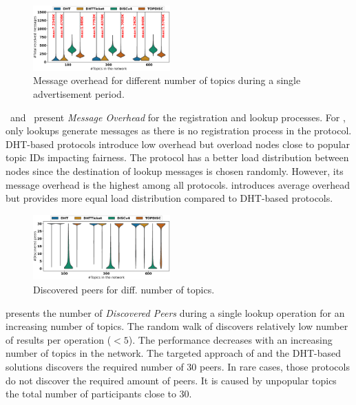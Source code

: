 	
\begin{figure}
\centering
\includegraphics[width=0.470\textwidth]{results/no_split/violin_topic_totalMsg.eps}
\caption{Message overhead for different number of topics during a single advertisement period.}
\label{fig:msgsPerTopic}
\vspace{-0.15in}
\end{figure}

~and~ present \emph{Message Overhead} for the registration and lookup processes. For \discv, only lookups generate messages as there is no registration process in the protocol.
DHT-based protocols introduce low overhead but overload nodes close to popular topic IDs impacting fairness.
The \discv protocol has a better load distribution between nodes since the destination of lookup messages is chosen randomly. However, its message overhead is the highest among all protocols. 
\sysname introduces average overhead but provides more equal load distribution compared to DHT-based protocols.


\begin{figure}[!h]
\includegraphics[width=0.470\textwidth]{results/no_split/violin_topic_discovered.eps}
\vspace{-0.05in}
\caption{Discovered peers for diff. number of topics.}
\label{fig:discoveredPerTopic}
\end{figure}

 presents the number of \emph{Discovered Peers} during a single lookup operation for an increasing number of topics. The random walk of \discv discovers relatively low number of results per operation ($< 5$). The performance decreases with an increasing number of topics in the network. The targeted approach of \sysname and the DHT-based solutions discovers the required number of 30 peers. In rare cases, those protocols do not discover the required amount of peers. It is caused by unpopular topics the total number of participants close to 30. 

